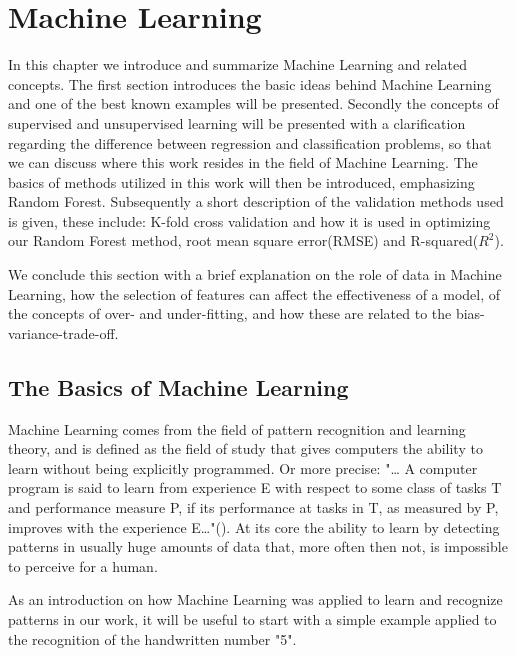 	
	
\pagebreak
\section{Machine Learning}

In this chapter we introduce and summarize Machine Learning and related concepts. The first section introduces the basic ideas behind Machine Learning and one of the best known examples will be presented. Secondly the concepts of supervised and unsupervised learning will be presented with a clarification regarding the difference between regression and classification problems, so that we can discuss where this work resides in the field of Machine Learning. The basics of methods utilized in this work will then be introduced, emphasizing Random Forest. Subsequently a short description of the validation methods used is given, these include: K-fold cross validation and how it is used in optimizing our Random Forest method, root mean square error(RMSE) and R-squared($R^2$).
   
We conclude this section with a brief explanation on the role of data in Machine Learning, how the selection of features can affect the effectiveness of a model, of the concepts of over- and under-fitting, and how these are related to the bias-variance-trade-off. 




\subsection{The Basics of Machine Learning}

Machine Learning comes from the field of pattern recognition and learning theory, and is defined as the field of study that gives computers the ability to learn without being explicitly programmed. Or more precise: "… A computer program is said to learn from experience E with respect to some class of tasks T and performance measure P, if its performance at tasks in T, as measured by P, improves with the experience E…"(\cite{mitchell1997machine}). At its core the ability to learn by detecting patterns in usually huge amounts of data that, more often then not, is impossible to perceive for a human. 


	As an introduction on how Machine Learning was applied to learn and recognize patterns in our work, it will be useful to start with a simple example applied to the recognition of the handwritten number "5". 
	

